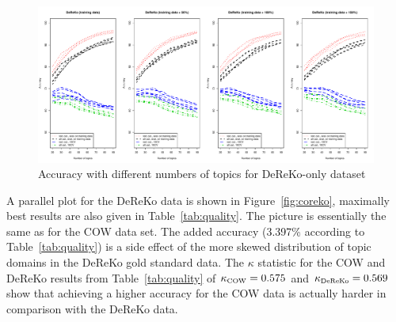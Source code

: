 \documentclass[11pt]{article}
\begin{document}
\begin{table}[ht]
  \centering
  \caption{Evaluation at best achievable accuracy with the reduced set of topic domains in 10-fold cross-validation; Precision, Recall, and F-Measure are weighted averages across all categories}
  \label{tab:quality}
\end{table}

\begin{figure}[ht]
  \centering
  \includegraphics[width=\textwidth]{graphics/dereko.pdf}
  \caption{Accuracy with different numbers of topics for DeReKo-only dataset}
  \label{fig:dereko}
\end{figure}

A parallel plot for the DeReKo data is shown in Figure~\ref{fig:coreko}, maximally best results are also given in Table~\ref{tab:quality}.
The picture is essentially the same as for the COW data set.
The added accuracy (3.397\% according to Table~\ref{tab:quality}) is a side effect of the more skewed distribution of topic domains in the DeReKo gold standard data.
The $\kappa$ statistic for the COW and DeReKo results from Table~\ref{tab:quality} of $\kappa_{\textrm{\tiny COW}}=0.575$ and $\kappa_{\textrm{\tiny DeReKo}}=0.569$ show that achieving a higher accuracy for the COW data is actually harder in comparison with the DeReKo data.
\end{document}
